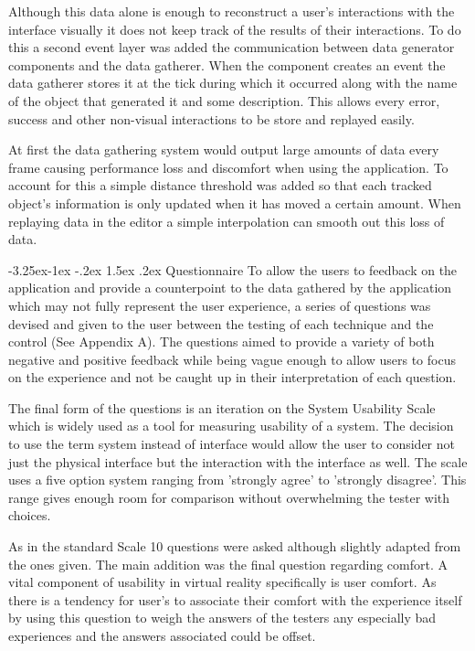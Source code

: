 \documentclass[12pt]{article}
\makeatletter
\renewcommand{\subsubsection}{\@startsection{subsubsection}{2}{\z@}%
             {-3.25ex\@plus -1ex \@minus -.2ex}%
             {1.5ex \@plus .2ex}%
             {\normalfont\normalsize\scshape\bfseries}}
\makeatother
\begin{document}
Although this data alone is enough to reconstruct a user's interactions with the interface visually it does not keep track of the results of their interactions. To do this a second event layer was added the communication between data generator components and the data gatherer. When the component creates an event the data gatherer stores it at the tick during which it occurred along with the name of the object that generated it and some description. This allows every error, success and other non-visual interactions to be store and replayed easily.

At first the data gathering system would output large amounts of data every frame causing performance loss and discomfort when using the application. To account for this a simple distance threshold was added so that each tracked object's information is only updated when it has moved a certain amount. When replaying data in the editor a simple interpolation can smooth out this loss of data.

\subsubsection{Questionnaire}
To allow the users to feedback on the application and provide a counterpoint to the data gathered by the application which may not fully represent the user experience, a series of questions was devised and given to the user between the testing of each technique and the control (See Appendix A). The questions aimed to provide a variety of both negative and positive feedback while being vague enough to allow users to focus on the experience and not be caught up in their interpretation of each question.

The final form of the questions is an iteration on the System Usability Scale which is widely used as a tool for measuring usability of a system. The decision to use the term system instead of interface would allow the user to consider not just the physical interface but the interaction with the interface as well. The scale uses a five option system ranging from 'strongly agree' to 'strongly disagree'. This range gives enough room for comparison without overwhelming the tester with choices. 

As in the standard Scale 10 questions were asked although slightly adapted from the ones given. The main addition was the final question regarding comfort. A vital component of usability in virtual reality specifically is user comfort. As there is a tendency for user's to associate their comfort with the experience itself by using this question to weigh the answers of the testers any especially bad experiences and the answers associated could be offset.
\end{document}
